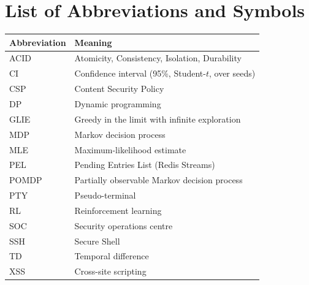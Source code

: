 \chapter*{List of Abbreviations and Symbols}

\begin{tabular}{@{}p{3.2cm}p{10cm}@{}}
\toprule
\textbf{Abbreviation} & \textbf{Meaning} \\
\midrule
ACID & Atomicity, Consistency, Isolation, Durability \\
CI & Confidence interval (95\%, Student-$t$, over seeds) \\
CSP & Content Security Policy \\
DP & Dynamic programming \\
GLIE & Greedy in the limit with infinite exploration \\
MDP & Markov decision process \\
MLE & Maximum-likelihood estimate \\
PEL & Pending Entries List (Redis Streams) \\
POMDP & Partially observable Markov decision process \\
PTY & Pseudo-terminal \\
RL & Reinforcement learning \\
SOC & Security operations centre \\
SSH & Secure Shell \\
TD & Temporal difference \\
XSS & Cross-site scripting \\
\bottomrule
\end{tabular}

